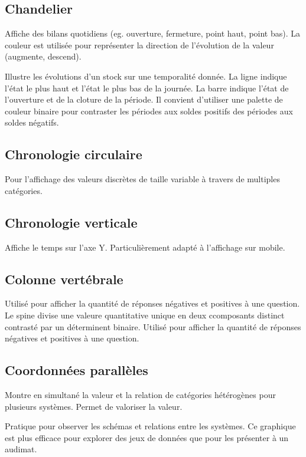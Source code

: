 \documentclass[a4paper,12pt]{article}
\begin{document}
\begin{multicols}{2}
\subsection*{Chandelier}
\label{sec:orgd2cde60}
Affiche des bilans quotidiens (eg. ouverture, fermeture, point haut, point bas). \autocite{alansmithLexiqueVisuel}
La couleur est utilisée pour représenter la direction de l'évolution de la valeur (augmente, descend).

Illustre les évolutions d'un stock sur une temporalité donnée. La ligne indique l'état le plus haut et l'état le plus bas de la journée. La barre indique l'état de l'ouverture et de la cloture de la période. \autocite{jonathanschwabishDistribution2021} Il convient d'utiliser une palette de couleur binaire pour contraster les périodes aux soldes positifs des périodes aux soldes négatifs.
\subsection*{Chronologie circulaire}
\label{sec:orgd1123e0}
Pour l'affichage des valeurs discrètes de taille variable à travers de multiples catégories. \autocite{alansmithLexiqueVisuel}
\subsection*{Chronologie verticale}
\label{sec:org04e7969}
Affiche le temps sur l'axe Y. Particulièrement adapté à l'affichage sur mobile. \autocite{alansmithLexiqueVisuel}
\subsection*{Colonne vertébrale}
\label{sec:org654e99b}
Utilisé pour afficher la quantité de réponses négatives et positives à une question. Le spine divise une valeure quantitative unique en deux ccomposants distinct contrasté par un déterminent binaire. \autocite{alansmithLexiqueVisuel} Utilisé pour afficher la quantité de réponses négatives et positives à une question.
\subsection*{Coordonnées parallèles}
\label{sec:org5a7ec30}
Montre en simultané la valeur et la relation de catégories hétérogènes pour plusieurs systèmes. \autocite{jonathanschwabishRelationship2021} Permet de valoriser la valeur. \autocite{alansmithLexiqueVisuel}

Pratique pour observer les schémas et relations entre les systèmes. \autocite{mikeyiHowChooseRight2020} Ce graphique est plus efficace pour explorer des jeux de données que pour les présenter à un audimat. \autocite{sosulskiGraphics2019}


\end{multicols}
\end{document}

